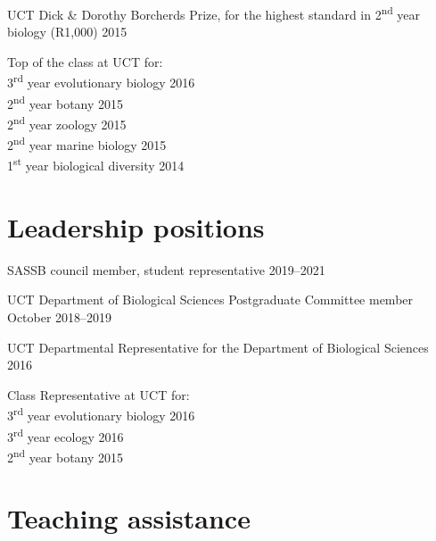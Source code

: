 \documentclass[10pt]{article}
\begin{document}
UCT Dick \& Dorothy Borcherds Prize, for the highest standard in 
  2\textsuperscript{nd} year biology (R1,000)                        \hfill 2015

Top of the class at UCT for: \\
\hspace{2em} 3\textsuperscript{rd} year evolutionary biology      \hfill 2016 \\
\hspace{2em} 2\textsuperscript{nd} year botany                    \hfill 2015 \\
\hspace{2em} 2\textsuperscript{nd} year zoology                   \hfill 2015 \\
\hspace{2em} 2\textsuperscript{nd} year marine biology            \hfill 2015 \\
\hspace{2em} 1\textsuperscript{st} year biological diversity      \hfill 2014

\section*{Leadership positions} %

SASSB council member, student representative                   \hfill 2019--2021

UCT Department of Biological Sciences Postgraduate Committee member
                                                       \hfill October 2018--2019

UCT Departmental Representative for the Department of Biological Sciences
                                                                     \hfill 2016

Class Representative at UCT for: \\
\hspace{2em} 3\textsuperscript{rd} year evolutionary biology      \hfill 2016 \\
\hspace{2em} 3\textsuperscript{rd} year ecology                   \hfill 2016 \\
\hspace{2em} 2\textsuperscript{nd} year botany                    \hfill 2015

\clearpage %

\section*{Teaching assistance} %
\end{document}

